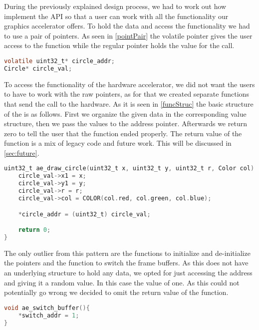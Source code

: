 During the previously explained design process, we had to work out how implement the API so that a user can work with all the functionality our graphics accelerator offers. To hold the data and access the functionality we had to use a pair of pointers. As seen in \cref{pointPair} the volatile pointer gives the user access to the function while the regular pointer holds the value for the call.
\begin{lstlisting}[language=C, caption={Pair of pointers}, label=pointPair]
volatile uint32_t* circle_addr;
Circle* circle_val;
\end{lstlisting}
To access the functionality of the hardware accelerator, we did not want the users to have to work with the raw pointers, as for that we created separate functions that send the call to the hardware. As it is seen in \cref{funcStruc} the basic structure of the is as follows. First we organize the given data in the corresponding value structure, then we pass the values to the address pointer. Afterwards we return zero to tell the user that the function ended properly. The return value of the function is a mix of legacy code and future work. This will be discussed in \cref{sec:future}.
\begin{lstlisting}[language=C, caption={Structure of the functions}, label=funcStruc]
uint32_t ae_draw_circle(uint32_t x, uint32_t y, uint32_t r, Color col) {
	circle_val->x1 = x;
	circle_val->y1 = y;
	circle_val->r = r;
	circle_val->col = COLOR(col.red, col.green, col.blue); 

	*circle_addr = (uint32_t) circle_val;

	return 0;
}
\end{lstlisting}
The only outlier from this pattern are the functions to initialize and de-initialize the pointers and the function to switch the frame buffers. As this does not have an underlying structure to hold any data, we opted for just accessing the address and giving it a random value. In this case the value of one. As this could not potentially go wrong we decided to omit the return value of the function.
\begin{lstlisting}[language=C, caption={Switching the Buffer}, label=switchBuff]
void ae_switch_buffer(){
	*switch_addr = 1;
}
\end{lstlisting}